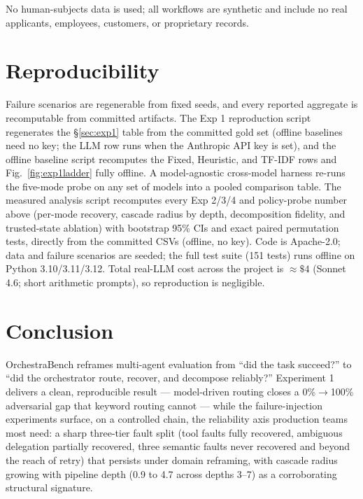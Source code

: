 \documentclass[sigconf,nonacm,anonymous]{acmart}  %
\begin{document}
No human-subjects data is used; all workflows are synthetic and include no real
applicants, employees, customers, or proprietary records.

\section{Reproducibility}
Failure scenarios are regenerable from fixed seeds, and every reported aggregate
is recomputable from committed artifacts. The Exp 1 reproduction script
regenerates the \S\ref{sec:exp1} table from the committed gold set (offline baselines need
no key; the LLM row runs when the Anthropic API key is set), and
the offline baseline script recomputes the Fixed, Heuristic, and TF-IDF rows
and Fig.~\ref{fig:exp1ladder} fully offline. A model-agnostic cross-model
harness re-runs the five-mode probe on any set of models into a pooled
comparison table. The measured
analysis script recomputes every Exp 2/3/4 and policy-probe number above
(per-mode recovery, cascade radius by depth, decomposition fidelity, and
trusted-state ablation) with bootstrap 95\% CIs and exact paired permutation
tests, directly from the committed CSVs (offline, no key).
Code is Apache-2.0; data and failure scenarios are seeded; the full test suite
(151 tests) runs offline on Python 3.10/3.11/3.12. Total real-LLM cost across the
project is $\approx\$4$ (Sonnet 4.6; short arithmetic prompts), so reproduction
is negligible.

\section{Conclusion}
OrchestraBench reframes multi-agent evaluation from ``did the task succeed?'' to
``did the orchestrator route, recover, and decompose reliably?'' Experiment 1
delivers a clean, reproducible result --- model-driven routing closes a
0\%$\to$100\% adversarial gap that keyword routing cannot --- while the
failure-injection experiments surface, on a controlled chain, the reliability
axis production teams most need: a sharp three-tier fault split (tool faults
fully recovered, ambiguous delegation partially recovered, three semantic faults
never recovered and beyond the reach of retry) that persists under domain
reframing, with cascade radius growing with pipeline depth (0.9 to 4.7 across
depths 3--7) as a corroborating structural signature.




\end{document}
